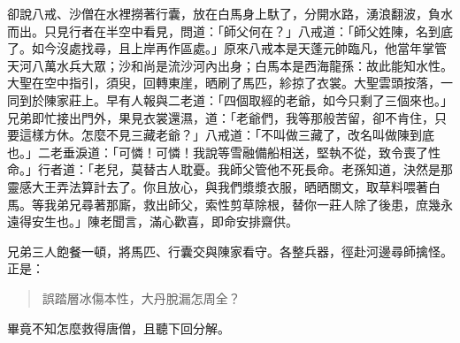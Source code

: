 卻說八戒、沙僧在水裡撈著行囊，放在白馬身上馱了，分開水路，湧浪翻波，負水而出。只見行者在半空中看見，問道：「師父何在？」八戒道：「師父姓陳，名到底了。如今沒處找尋，且上岸再作區處。」原來八戒本是天蓬元帥臨凡，他當年掌管天河八萬水兵大眾；沙和尚是流沙河內出身；白馬本是西海龍孫：故此能知水性。大聖在空中指引，須臾，回轉東崖，晒刷了馬匹，紾掠了衣裳。大聖雲頭按落，一同到於陳家莊上。早有人報與二老道：「四個取經的老爺，如今只剩了三個來也。」兄弟即忙接出門外，果見衣裳還濕，道：「老爺們，我等那般苦留，卻不肯住，只要這樣方休。怎麼不見三藏老爺？」八戒道：「不叫做三藏了，改名叫做陳到底也。」二老垂淚道：「可憐！可憐！我說等雪融備船相送，堅執不從，致令喪了性命。」行者道：「老兒，莫替古人耽憂。我師父管他不死長命。老孫知道，決然是那靈感大王弄法算計去了。你且放心，與我們漿漿衣服，晒晒關文，取草料喂著白馬。等我弟兄尋著那廝，救出師父，索性剪草除根，替你一莊人除了後患，庶幾永遠得安生也。」陳老聞言，滿心歡喜，即命安排齋供。

兄弟三人飽餐一頓，將馬匹、行囊交與陳家看守。各整兵器，徑赴河邊尋師擒怪。正是：
\begin{quote}
誤踏層冰傷本性，大丹脫漏怎周全？
\end{quote}

畢竟不知怎麼救得唐僧，且聽下回分解。
